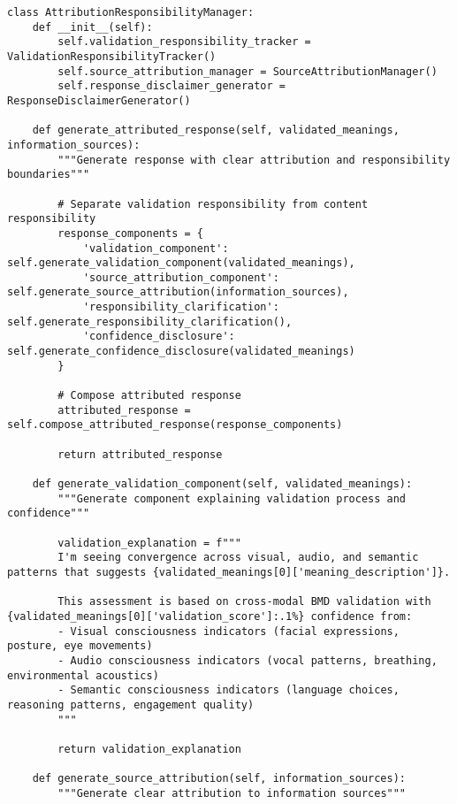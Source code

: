 \documentclass[12pt,a4paper]{article}
\begin{document}
\begin{lstlisting}[style=pythonstyle, caption=Attribution Problem Resolution Framework]
class AttributionResponsibilityManager:
    def __init__(self):
        self.validation_responsibility_tracker = ValidationResponsibilityTracker()
        self.source_attribution_manager = SourceAttributionManager()
        self.response_disclaimer_generator = ResponseDisclaimerGenerator()
        
    def generate_attributed_response(self, validated_meanings, information_sources):
        """Generate response with clear attribution and responsibility boundaries"""
        
        # Separate validation responsibility from content responsibility
        response_components = {
            'validation_component': self.generate_validation_component(validated_meanings),
            'source_attribution_component': self.generate_source_attribution(information_sources),
            'responsibility_clarification': self.generate_responsibility_clarification(),
            'confidence_disclosure': self.generate_confidence_disclosure(validated_meanings)
        }
        
        # Compose attributed response
        attributed_response = self.compose_attributed_response(response_components)
        
        return attributed_response
    
    def generate_validation_component(self, validated_meanings):
        """Generate component explaining validation process and confidence"""
        
        validation_explanation = f"""
        I'm seeing convergence across visual, audio, and semantic patterns that suggests {validated_meanings[0]['meaning_description']}. 
        
        This assessment is based on cross-modal BMD validation with {validated_meanings[0]['validation_score']:.1%} confidence from:
        - Visual consciousness indicators (facial expressions, posture, eye movements)
        - Audio consciousness indicators (vocal patterns, breathing, environmental acoustics)  
        - Semantic consciousness indicators (language choices, reasoning patterns, engagement quality)
        """
        
        return validation_explanation
    
    def generate_source_attribution(self, information_sources):
        """Generate clear attribution to information sources"""
        

\end{lstlisting}
\end{document}
